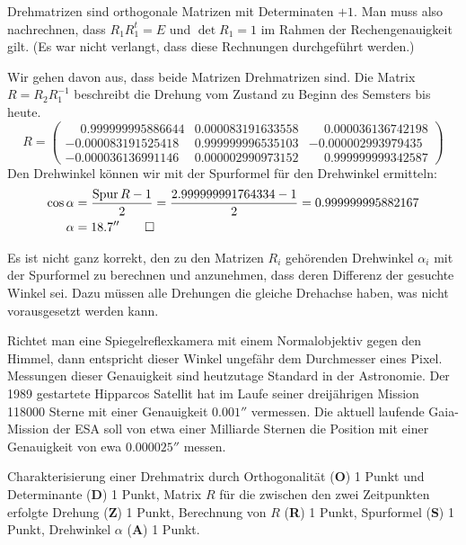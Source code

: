 \begin{loesung}
\begin{teilaufgaben}
\item
Drehmatrizen sind orthogonale Matrizen mit Determinaten $+1$.
Man muss also nachrechnen, dass $R_1R_1^t=E$ und $\det R_1=1$
im Rahmen der Rechengenauigkeit gilt. (Es war nicht verlangt,
dass diese Rechnungen durchgeführt werden.)
\item
Wir gehen davon aus, dass beide Matrizen Drehmatrizen sind.
Die Matrix $R=R_2R_1^{-1}$ beschreibt die Drehung vom Zustand zu Beginn
des Semsters bis heute.
\[
R = \begin{pmatrix}
\phantom{-}0.999999995886644& 0.000083191633558&\phantom{-}0.000036136742198\\
          -0.000083191525418& 0.999999996535103&          -0.000002993979435\\
          -0.000036136991146& 0.000002990973152&\phantom{-}0.999999999342587
\end{pmatrix}
\]
Den Drehwinkel können wir mit der Spurformel für den Drehwinkel ermitteln:
\begin{align*}
\cos\alpha
&=
\frac{\operatorname{Spur}R-1}2=\frac{2.999999991764334-1}2
=
0.999999995882167
\\
\alpha&=18.7''
\qedhere
\end{align*}
\end{teilaufgaben}
\end{loesung}

\begin{diskussion}
Es ist nicht ganz korrekt, den zu den Matrizen $R_i$ gehörenden Drehwinkel
$\alpha_i$ mit der Spurformel zu berechnen und anzunehmen, dass deren
Differenz der gesuchte Winkel sei.
Dazu müssen alle Drehungen die gleiche Drehachse haben, was nicht
vorausgesetzt werden kann.

Richtet man eine Spiegelreflexkamera mit einem Normalobjektiv gegen den
Himmel, dann entspricht dieser Winkel ungefähr dem Durchmesser eines Pixel.
Messungen dieser Genauigkeit sind heutzutage Standard in der Astronomie.
Der 1989 gestartete Hipparcos Satellit hat im Laufe seiner dreijährigen
Mission 118000 Sterne mit einer Genauigkeit $0.001''$ vermessen.
Die aktuell laufende Gaia-Mission der ESA soll von etwa einer Milliarde
Sternen die Position mit einer Genauigkeit von ewa $0.000025''$ messen.
\end{diskussion}

\begin{bewertung}
Charakterisierung einer Drehmatrix durch Orthogonalität ({\bf O}) 1 Punkt
und Determinante ({\bf D}) 1 Punkt,
Matrix $R$ für die zwischen den zwei Zeitpunkten erfolgte Drehung ({\bf Z})
1 Punkt,
Berechnung von $R$ ({\bf R}) 1 Punkt,
Spurformel ({\bf S}) 1 Punkt,
Drehwinkel $\alpha$ ({\bf A}) 1 Punkt.
\end{bewertung}

